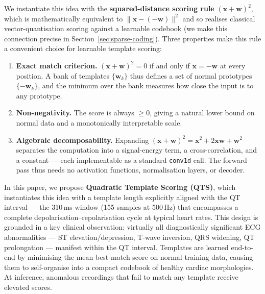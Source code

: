 \documentclass{iopjournal}
\begin{document}
We instantiate this idea with the \textbf{squared-distance scoring rule} $(\mathbf{x} + \mathbf{w})^2$, which is mathematically equivalent to $\|\mathbf{x} - (-\mathbf{w})\|^2$ and so realises classical vector-quantisation scoring against a learnable codebook (we make this connection precise in Section~\ref{sec:sparse-coding}). Three properties make this rule a convenient choice for learnable template scoring:
\begin{enumerate}
\item \textbf{Exact match criterion.} $(\mathbf{x} + \mathbf{w})^2 = 0$ if and only if $\mathbf{x} = -\mathbf{w}$ at every position. A bank of templates $\{\mathbf{w}_k\}$ thus defines a set of normal prototypes $\{-\mathbf{w}_k\}$, and the minimum over the bank measures how close the input is to any prototype.
\item \textbf{Non-negativity.} The score is always $\geq 0$, giving a natural lower bound on normal data and a monotonically interpretable scale.
\item \textbf{Algebraic decomposability.} Expanding $(\mathbf{x} + \mathbf{w})^2 = \mathbf{x}^2 + 2\mathbf{x}\mathbf{w} + \mathbf{w}^2$ separates the computation into a signal-energy term, a cross-correlation, and a constant --- each implementable as a standard \texttt{conv1d} call. The forward pass thus needs no activation functions, normalisation layers, or decoder.
\end{enumerate}

In this paper, we propose \textbf{Quadratic Template Scoring (QTS)}, which instantiates this idea with a template length explicitly aligned with the QT interval --- the 310\,ms window (155 samples at 500\,Hz) that encompasses a complete depolarisation--repolarisation cycle at typical heart rates. This design is grounded in a key clinical observation: virtually all diagnostically significant ECG abnormalities --- ST elevation/depression, T-wave inversion, QRS widening, QT prolongation --- manifest within the QT interval. Templates are learned end-to-end by minimising the mean best-match score on normal training data, causing them to self-organise into a compact codebook of healthy cardiac morphologies. At inference, anomalous recordings that fail to match any template receive elevated scores.
\end{document}
